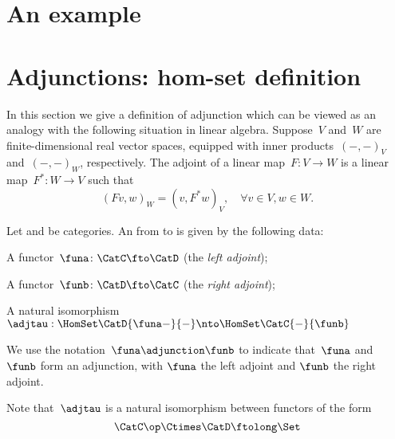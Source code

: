 

\section{An example}



\section{Adjunctions: hom-set definition}
In this section we give a definition of adjunction which can be viewed as an analogy with the following situation in linear algebra. Suppose~$V$ and~$W$ are finite-dimensional real vector spaces, equipped with inner products~$(-, -)_V$ and~$(-, -)_W$, respectively. The adjoint of a linear map~$F\colon V \to W$ is a linear map~$F^*\colon W \rightarrow V$ such that
\begin{equation*}
  (Fv, w)_W = (v, F^*w)_V, \quad \forall v \in V, w \in W.
\end{equation*}


\begin{ctdefinition}
  \label{def:adj-iso}
  \label{def:cat-adjunction-v1}
  Let \CatC and \CatD be categories. An \emph{} from \CatC to \CatD is given by the following data:
  \begin{compactenum}
    \item A functor~$\funa\colon \CatC \fto \CatD$ (the \emph{left adjoint});
    \item A functor~$\funb\colon \CatD \fto \CatC$ (the \emph{right adjoint});
    \item A natural isomorphism~$\adjtau: \HomSet\CatD{\funa -}{-} \nto \HomSet\CatC{-}{\funb}$
  \end{compactenum}
  We use the notation~$\funa \adjunction  \funb$ to indicate that~$\funa$ and~$\funb$ form an adjunction, with $\funa$ the left adjoint and $\funb$ the right adjoint.
\end{ctdefinition}

\begin{remark}
  Note that~$\adjtau$ is a natural isomorphism between functors of the form
  \begin{equation}
    \CatC\op \Ctimes \CatD \ftolong   \Set
  \end{equation}
\end{remark}




